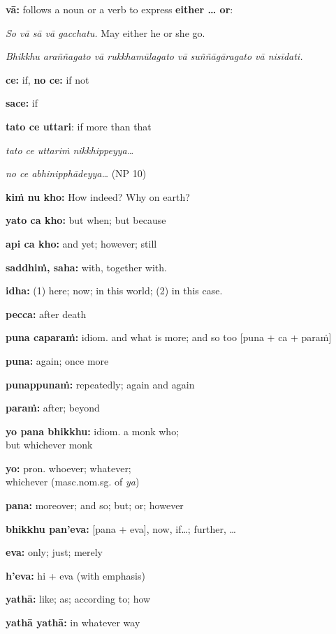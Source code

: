\documentclass[11pt,oneside]{memoir}
\begin{document}
\begin{multicols}{2}

\textbf{vā:} follows a noun or a verb to express \textbf{either \ldots{} or}:

\emph{So vā sā vā gacchatu.} May either he or she go.

\emph{Bhikkhu araññagato vā rukkhamūlagato vā suññāgāragato vā nisīdati.}

\textbf{ce:} if, \textbf{no ce:} if not

\textbf{sace:} if

\textbf{tato ce uttari}: if more than that

\emph{tato ce uttariṁ nikkhippeyya\ldots{}}

\emph{no ce abhinipphādeyya\ldots{}} (NP 10)

\textbf{kiṁ nu kho:} How indeed? Why on earth?

\textbf{yato ca kho:} but when; but because

\textbf{api ca kho:} and yet; however; still

\textbf{saddhiṁ, saha:} with, together with.

\textbf{idha:} (1) here; now; in this world; (2) in this case.

\textbf{pecca:} after death

\columnbreak

\textbf{puna caparaṁ:} idiom. and what is more; and so too [puna + ca + paraṁ]

\textbf{puna:} again; once more

\textbf{punappunaṁ:} repeatedly; again and again

\textbf{paraṁ:} after; beyond

\textbf{yo pana bhikkhu:} idiom. a monk who;\\[0pt]
but whichever monk

\textbf{yo:} pron. whoever; whatever;\\[0pt]
whichever (masc.nom.sg. of \emph{ya})

\textbf{pana:} moreover; and so; but; or; however

\textbf{bhikkhu pan'eva:} [pana + eva], now, if\ldots{}; further, \ldots{}

\textbf{eva:} only; just; merely

\textbf{h'eva:} hi + eva (with emphasis)

\textbf{yathā:} like; as; according to; how

\textbf{yathā yathā:} in whatever way

\end{multicols}
\end{document}
